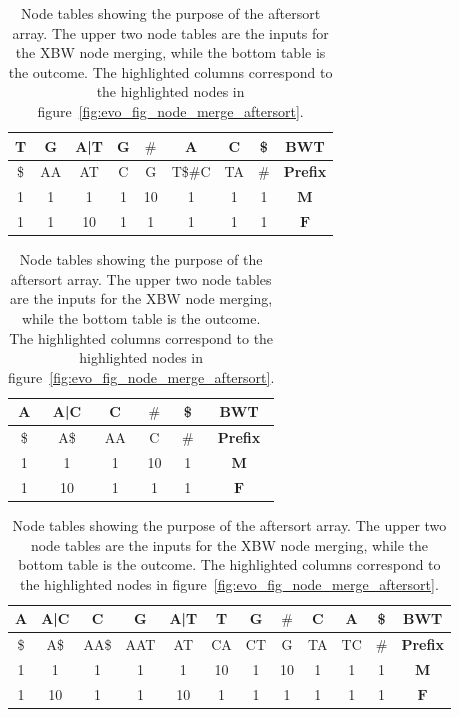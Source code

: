 \documentclass[a4paper,12pt,twoside,BCOR=10mm]{scrbook}
\begin{document}
\begin{table}[htb]
\centering
\caption[Node tables showing purpose of aftersort array]{Node tables showing the purpose of the aftersort array. The upper two node tables are the inputs for the XBW node merging, while the bottom table is the outcome. The highlighted columns correspond to the highlighted nodes in figure~\ref{fig:evo_fig_node_merge_aftersort}.}

{
\renewcommand{\tabcolsep}{4pt}
\begin{tabular}{ | c | c | c | c | c | c | c | c | c | }
\hline
T & G & A|T & G & $\#$ &\cellcolor{green_bg}\color{green_fx}A &\cellcolor{purple_bg}\color{purple_fx}C & \$ & \textbf{BWT} \\ \hline
\$ & AA & AT & C & G &\cellcolor{green_bg}\color{green_fx}T\$$\#$C &\cellcolor{purple_bg}\color{purple_fx}TA & $\#$ & \textbf{Prefix} \\ \hline
1 & 1 & 1 & 1 & 10 &\cellcolor{green_bg}\color{green_fx}1 &\cellcolor{purple_bg}\color{purple_fx}1 & 1 & $\boldsymbol{M}$ \\ \hline
1 & 1 & 10 & 1 & 1 &\cellcolor{green_bg}\color{green_fx}1 &\cellcolor{purple_bg}\color{purple_fx}1 & 1 & $\boldsymbol{F}$ \\ \hline
\end{tabular}
\quad
\begin{tabular}{ | c | c | c | c | c | c | }
\hline
A & A|C & C & $\#$ & \$ & \textbf{BWT} \\ \hline
\$ & A\$ & AA & C & $\#$ & \textbf{Prefix} \\ \hline
1 & 1 & 1 & 10 & 1 & $\boldsymbol{M}$ \\ \hline
1 & 10 & 1 & 1 & 1 & $\boldsymbol{F}$ \\ \hline
\end{tabular}
}

\vspace{0.5cm}

\begin{tabular}{ | c | c | c | c | c | c | c | c | c | c | c | c | }
\hline
A & A|C & C & G & A|T & T & G & $\#$ &\cellcolor{purple_bg}\color{purple_fx}C &\cellcolor{green_bg}\color{green_fx}A & \$ & \textbf{BWT} \\ \hline
\$ & A\$ & AA\$ & AAT & AT & CA & CT & G &\cellcolor{purple_bg}\color{purple_fx}TA &\cellcolor{green_bg}\color{green_fx}TC & $\#$ & \textbf{Prefix} \\ \hline
1 & 1 & 1 & 1 & 1 & 10 & 1 & 10 &\cellcolor{purple_bg}\color{purple_fx}1 &\cellcolor{green_bg}\color{green_fx}1 & 1 & $\boldsymbol{M}$ \\ \hline
1 & 10 & 1 & 1 & 10 & 1 & 1 & 1 &\cellcolor{purple_bg}\color{purple_fx}1 &\cellcolor{green_bg}\color{green_fx}1 & 1 & $\boldsymbol{F}$ \\ \hline
\end{tabular}

\label{table:node_merge_aftersort}
\end{table}
\end{document}
